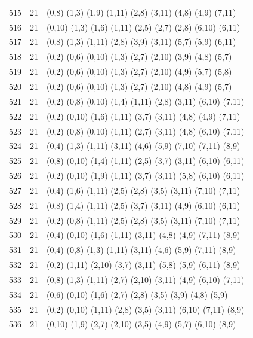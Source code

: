 \begin{appendix}
{\begin{longtable}{lll}
515& 21 & (0,8)   (1,3)  (1,9)  (1,11)  (2,8)   (3,11)  (4,8)   (4,9)   (7,11)\\
516& 21 & (0,10)  (1,3)  (1,6)  (1,11)  (2,5)   (2,7)   (2,8)   (6,10)  (6,11)\\
517& 21 & (0,8)   (1,3)  (1,11) (2,8)   (3,9)   (3,11)  (5,7)   (5,9)   (6,11)\\
518& 21 & (0,2)   (0,6)  (0,10) (1,3)   (2,7)   (2,10)  (3,9)   (4,8)   (5,7)\\
519& 21 & (0,2)   (0,6)  (0,10) (1,3)   (2,7)   (2,10)  (4,9)   (5,7)   (5,8)\\
520& 21 & (0,2)   (0,6)  (0,10) (1,3)   (2,7)   (2,10)  (4,8)   (4,9)   (5,7)\\
521& 21 & (0,2)   (0,8)  (0,10) (1,4)   (1,11)  (2,8)   (3,11)  (6,10)  (7,11)\\
522& 21 & (0,2)   (0,10) (1,6)  (1,11)  (3,7)   (3,11)  (4,8)   (4,9)   (7,11)\\
523& 21 & (0,2)   (0,8)  (0,10) (1,11)  (2,7)   (3,11)  (4,8)   (6,10)  (7,11)\\
524& 21 & (0,4)   (1,3)  (1,11) (3,11)  (4,6)   (5,9)   (7,10)  (7,11)  (8,9)\\
525& 21 & (0,8)   (0,10) (1,4)  (1,11)  (2,5)   (3,7)   (3,11)  (6,10)  (6,11)\\
526& 21 & (0,2)   (0,10) (1,9)  (1,11)  (3,7)   (3,11)  (5,8)   (6,10)  (6,11)\\
527& 21 & (0,4)   (1,6)  (1,11) (2,5)   (2,8)   (3,5)   (3,11)  (7,10)  (7,11)\\
528& 21 & (0,8)   (1,4)  (1,11) (2,5)   (3,7)   (3,11)  (4,9)   (6,10)  (6,11)\\
529& 21 & (0,2)   (0,8)  (1,11) (2,5)   (2,8)   (3,5)   (3,11)  (7,10)  (7,11)\\
530& 21 & (0,4)   (0,10) (1,6)  (1,11)  (3,11)  (4,8)   (4,9)   (7,11)  (8,9)\\
531& 21 & (0,4)   (0,8)  (1,3)  (1,11)  (3,11)  (4,6)   (5,9)   (7,11)  (8,9)\\
532& 21 & (0,2)   (1,11) (2,10) (3,7)   (3,11)  (5,8)   (5,9)   (6,11)  (8,9)\\
533& 21 & (0,8)   (1,3)  (1,11) (2,7)   (2,10)  (3,11)  (4,9)   (6,10)  (7,11)\\
534& 21 & (0,6)   (0,10) (1,6)  (2,7)   (2,8)   (3,5)   (3,9)   (4,8)   (5,9)\\
535& 21 & (0,2)   (0,10) (1,11) (2,8)   (3,5)   (3,11)  (6,10)  (7,11)  (8,9)\\
536& 21 & (0,10)  (1,9)  (2,7)  (2,10)  (3,5)   (4,9)   (5,7)   (6,10)  (8,9)\\

\end{longtable}}
\end{appendix}
